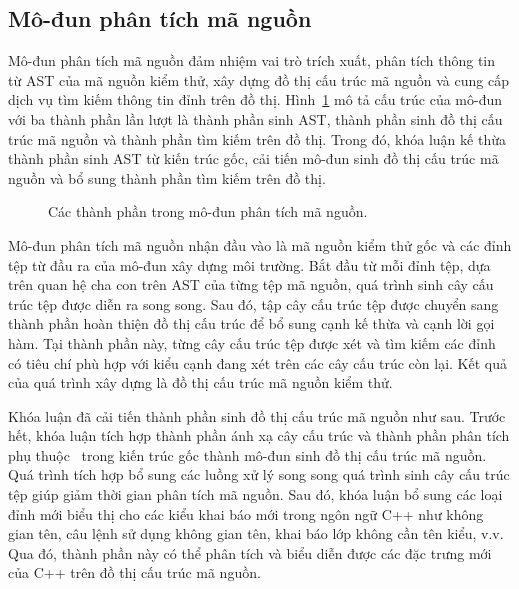 \subsection{Mô-đun phân tích mã nguồn}\label{sec:module-analyze}
Mô-đun phân tích mã nguồn đảm nhiệm vai trò trích xuất, phân tích thông tin từ AST của mã nguồn kiểm thử, xây dựng đồ thị cấu trúc mã nguồn và cung cấp dịch vụ tìm kiếm thông tin đỉnh trên đồ thị. Hình~\ref{fig:module-analyze} mô tả cấu trúc của mô-đun với ba thành phần lần lượt là thành phần sinh AST, thành phần sinh đồ thị cấu trúc mã nguồn và thành phần tìm kiếm trên đồ thị. Trong đó, khóa luận kế thừa thành phần sinh AST từ kiến trúc gốc, cải tiến mô-đun sinh đồ thị cấu trúc mã nguồn và bổ sung thành phần tìm kiếm trên đồ thị.

\begin{figure}[h]
    \centering
    
    \caption{Các thành phần trong mô-đun phân tích mã nguồn.}
    \label{fig:module-analyze}
\end{figure}

Mô-đun phân tích mã nguồn nhận đầu vào là mã nguồn kiểm thử gốc và các đỉnh tệp từ đầu ra của mô-đun xây dựng môi trường. Bắt đầu từ mỗi đỉnh tệp, dựa trên quan hệ cha con trên AST của từng tệp mã nguồn, quá trình sinh cây cấu trúc tệp được diễn ra song song. Sau đó, tập cây cấu trúc tệp được chuyển sang thành phần hoàn thiện đồ thị cấu trúc để bổ sung cạnh kế thừa và cạnh lời gọi hàm. Tại thành phần này, từng cây cấu trúc tệp được xét và tìm kiếm các đỉnh có tiêu chí phù hợp với kiểu cạnh đang xét trên các cây cấu trúc còn lại. Kết quả của quá trình xây dựng là đồ thị cấu trúc mã nguồn kiểm thử.

Khóa luận đã cải tiến thành phần sinh đồ thị cấu trúc mã nguồn như sau. Trước hết, khóa luận tích hợp thành phần ánh xạ cây cấu trúc và thành phần phân tích phụ thuộc~\cite{TUNG2022106821} trong kiến trúc gốc thành mô-đun sinh đồ thị cấu trúc mã nguồn. Quá trình tích hợp bổ sung các luồng xử lý song song quá trình sinh cây cấu trúc tệp giúp giảm thời gian phân tích mã nguồn. Sau đó, khóa luận bổ sung các loại đỉnh mới biểu thị cho các kiểu khai báo mới trong ngôn ngữ C++ như không gian tên, câu lệnh sử dụng không gian tên, khai báo lớp không cần tên kiểu, v.v. Qua đó, thành phần này có thể phân tích và biểu diễn được các đặc trưng mới của C++ trên đồ thị cấu trúc mã nguồn.\\


